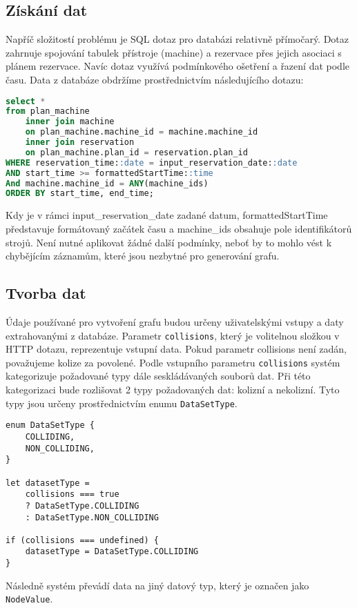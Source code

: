 \subsection{Získání dat}
Napříč složitostí problému je SQL dotaz pro databázi relativně přímočarý. Dotaz zahrnuje spojování tabulek přístroje (machine) a rezervace přes jejich asociaci s plánem rezervace. Navíc dotaz využívá podmínkového ošetření a řazení dat podle času. Data z databáze obdržíme prostřednictvím následujícího dotazu:

\begin{lstlisting}[language=SQL]
select * 
from plan_machine 
    inner join machine 
	on plan_machine.machine_id = machine.machine_id
    inner join reservation
	on plan_machine.plan_id = reservation.plan_id
WHERE reservation_time::date = input_reservation_date::date
AND start_time >= formattedStartTime::time
And machine.machine_id = ANY(machine_ids)
ORDER BY start_time, end_time;
\end{lstlisting}
Kdy je v rámci input\_reservation\_date zadané datum, formattedStartTime představuje formátovaný začátek času a machine\_ids obsahuje pole identifikátorů strojů. Není nutné aplikovat žádné další podmínky, neboť by to mohlo vést k chybějícím záznamům, které jsou nezbytné pro generování grafu.

\subsection{Tvorba dat}
Údaje používané pro vytvoření grafu budou určeny uživatelskými vstupy a daty extrahovanými z databáze. Parametr \texttt{collisions}, který je volitelnou složkou v HTTP dotazu, reprezentuje vstupní data. Pokud parametr collisions není zadán, považujeme kolize za povolené. Podle vstupního parametru \texttt{collisions} systém kategorizuje požadované typy dále seskládávaných souborů dat. Při této kategorizaci bude rozlišovat 2 typy požadovaných dat: kolizní a nekolizní. Tyto typy jsou určeny prostřednictvím enumu \texttt{DataSetType}.

\begin{lstlisting}
enum DataSetType {
    COLLIDING,
    NON_COLLIDING,
}

let datasetType =
    collisions === true
	? DataSetType.COLLIDING
	: DataSetType.NON_COLLIDING

if (collisions === undefined) {
    datasetType = DataSetType.COLLIDING
}
\end{lstlisting}

Následně systém převádí data na jiný datový typ, který je označen jako \texttt{NodeValue}.

